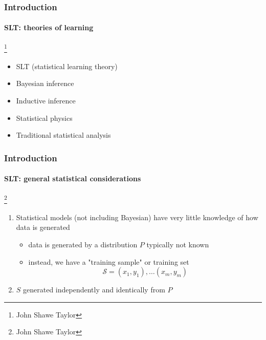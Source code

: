 \begin{frame}
\frametitle{Introduction}
\framesubtitle{SLT: theories of learning}
\footnote{John Shawe Taylor}
\logoCSIPCPL\mypagenum
	\begin{itemize}
		\item SLT (statistical learning theory)
		\item Bayesian inference
		\item Inductive inference
		\item Statistical physics
		\item Traditional statistical analysis
	\end{itemize}
\end{frame}


\begin{frame}
\frametitle{Introduction}
\framesubtitle{SLT: general statistical considerations}
\footnote{John Shawe Taylor}
\logoCSIPCPL\mypagenum
	\begin{enumerate}
		\item Statistical models (not including Bayesian) have very little knowledge of how data is generated
			\begin{itemize}
				\item data is generated by a distribution $P$ typically not known
				\item instead, we have a "training sample" or training set
					\begin{equation*}
						\mathcal{S} = {(x_1, y_1), \ldots (x_m, y_m)}
					\end{equation*}
			\end{itemize}
		\item $S$ generated independently and identically from $P$
	\end{enumerate}
\end{frame}


